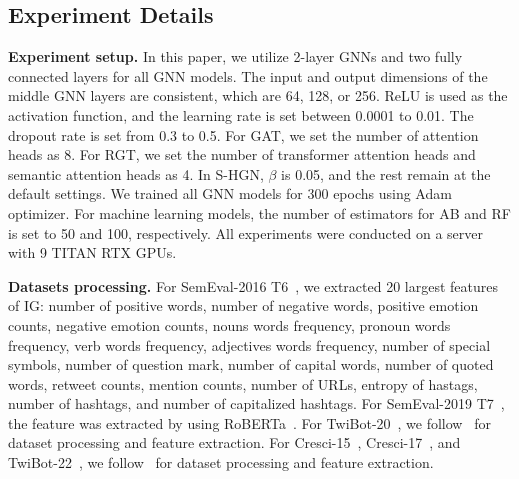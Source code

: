 \documentclass[10pt,twocolumn,letterpaper]{article}
\begin{document}
\subsection{Experiment Details}
\label{sec:ComputationDetails}
\noindent
\textbf{Experiment setup.}
In this paper, we utilize 2-layer GNNs and two fully connected layers for all GNN models. The input and output dimensions of the middle GNN layers are consistent, which are 64, 128, or 256. ReLU is used as the activation function, and the learning rate is set between 0.0001 to 0.01. The dropout rate is set from 0.3 to 0.5. For GAT, we set the number of attention heads as 8. For RGT, we set the number of transformer attention heads and semantic attention heads as 4. In S-HGN, $\beta$ is 0.05, and the rest remain at the default settings. We trained all GNN models for 300 epochs using Adam optimizer. For machine learning models, the number of estimators for AB and RF is set to 50 and 100, respectively. All experiments were conducted on a server with 9 TITAN RTX GPUs.

\noindent
\textbf{Datasets processing.}
For SemEval-2016 T6~\cite{Alpher21}, we extracted 20 largest features of IG: number of positive words, number of negative words, positive emotion counts, negative emotion counts, nouns words frequency, pronoun words frequency, verb words frequency, adjectives words frequency, number of special symbols, number of question mark, number of capital words, number of quoted words, retweet counts, mention counts, number of URLs, entropy of hastags, number of hashtags, and number of capitalized hashtags. For SemEval-2019 T7~\cite{Alpher25}, the feature was extracted by using RoBERTa~\cite{Alpher62}. For TwiBot-20~\cite{Alpher11}, we follow~\cite{Alpher06} for dataset processing and feature extraction. For Cresci-15~\cite{Alpher10}, Cresci-17~\cite{Alpher04}, and TwiBot-22~\cite{Alpher12}, we follow~\cite{Alpher12} for dataset processing and feature extraction.
\end{document}
